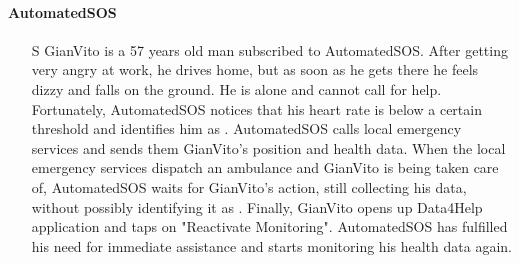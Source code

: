 \documentclass[../../../rasd.tex]{subfiles}
\begin{document}
                \paragraph{AutomatedSOS}
                \begin{itemize}
                    \item[S\subs{7}] GianVito is a 57 years old man subscribed to AutomatedSOS. After getting very angry at work, he drives home, but as soon as he gets there he feels dizzy and falls on the ground. He is alone and cannot call for help. Fortunately, AutomatedSOS notices that his heart rate is below a certain threshold and identifies him as . AutomatedSOS calls local emergency services and sends them GianVito's position and health data. When the local emergency services dispatch an ambulance and GianVito is being taken care of, AutomatedSOS waits for GianVito's action, still collecting his data, without possibly identifying it as . Finally, GianVito opens up Data4Help application and taps on "Reactivate Monitoring". AutomatedSOS has fulfilled his need for immediate assistance and starts monitoring his health data again.
                \end{itemize}
\end{document}
